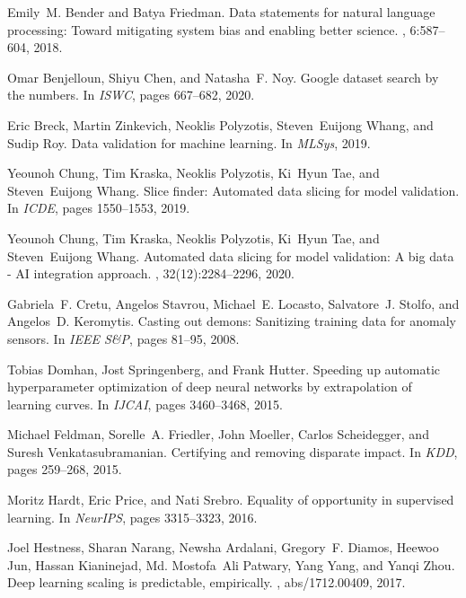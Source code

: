 \documentclass[11pt]{article}
\begin{document}
\begin{thebibliography}{10}
Emily~M. Bender and Batya Friedman.
\newblock Data statements for natural language processing: Toward mitigating
  system bias and enabling better science.
, 6:587--604, 2018.

Omar Benjelloun, Shiyu Chen, and Natasha~F. Noy.
\newblock Google dataset search by the numbers.
\newblock In {\em ISWC}, pages 667--682, 2020.

Eric Breck, Martin Zinkevich, Neoklis Polyzotis, Steven~Euijong Whang, and
  Sudip Roy.
\newblock Data validation for machine learning.
\newblock In {\em MLSys}, 2019.

Yeounoh Chung, Tim Kraska, Neoklis Polyzotis, Ki~Hyun Tae, and Steven~Euijong
  Whang.
\newblock Slice finder: Automated data slicing for model validation.
\newblock In {\em ICDE}, pages 1550--1553, 2019.

Yeounoh Chung, Tim Kraska, Neoklis Polyzotis, Ki~Hyun Tae, and Steven~Euijong
  Whang.
\newblock Automated data slicing for model validation: {A} big data - {AI}
  integration approach.
, 32(12):2284--2296, 2020.

Gabriela~F. Cretu, Angelos Stavrou, Michael~E. Locasto, Salvatore~J. Stolfo,
  and Angelos~D. Keromytis.
\newblock Casting out demons: Sanitizing training data for anomaly sensors.
\newblock In {\em IEEE S{\&}P}, pages 81--95, 2008.

Tobias Domhan, Jost Springenberg, and Frank Hutter.
\newblock Speeding up automatic hyperparameter optimization of deep neural
  networks by extrapolation of learning curves.
\newblock In {\em IJCAI}, pages 3460--3468, 2015.

Michael Feldman, Sorelle~A. Friedler, John Moeller, Carlos Scheidegger, and
  Suresh Venkatasubramanian.
\newblock Certifying and removing disparate impact.
\newblock In {\em KDD}, pages 259--268, 2015.

Moritz Hardt, Eric Price, and Nati Srebro.
\newblock Equality of opportunity in supervised learning.
\newblock In {\em NeurIPS}, pages 3315--3323, 2016.

Joel Hestness, Sharan Narang, Newsha Ardalani, Gregory~F. Diamos, Heewoo Jun,
  Hassan Kianinejad, Md. Mostofa~Ali Patwary, Yang Yang, and Yanqi Zhou.
\newblock Deep learning scaling is predictable, empirically.
, abs/1712.00409, 2017.


\end{thebibliography}
\end{document}

